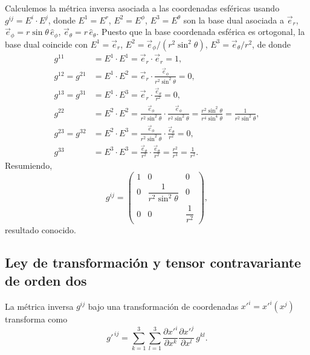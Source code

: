 Calculemos la métrica inversa asociada a las coordenadas esféricas usando $g^{ij}=E^i\cdot E^j$, donde $E^1=E^r$, $E^2=E^\phi$, $E^3=E^\theta$ son la base dual asociada a $\vec e_r$, $\vec e_\phi=r\sin\theta\,\hat e_\phi$, $\vec e_\theta = r\,\hat e_\theta$. Puesto que la base coordenada esférica es ortogonal, la base dual coincide con $E^1=\vec e_r$, $E^2=\vec e_\phi/(r^2\sin^2\theta)$, $E^3=\vec e_\theta/r^2$, de donde
\begin{align}
g^{11} &= E^1\cdot E^1 = \vec e_r\cdot\vec e_r = 1, \\
g^{12}=g^{21} &= E^1\cdot E^2 = \vec e_r\cdot \frac{\vec e_\phi}{r^2\sin^2\theta} = 0, \\
g^{13}=g^{31} &= E^1\cdot E^3 = \vec e_r\cdot\frac{\vec e_\theta}{r^2} = 0, \\
g^{22} &= E^2\cdot E^2 = \frac{\vec e_\phi}{r^2\sin^2\theta}\cdot\frac{\vec e_\phi}{r^2\sin^2\theta}
= \frac{r^2\sin^2\theta}{r^4\sin^4\theta} = \frac{1}{r^2\sin^2\theta}, \\
g^{23}=g^{32} &= E^2\cdot E^3 = \frac{\vec e_\phi}{r^2\sin^2\theta}\cdot\frac{\vec e_\theta}{r^2} = 0, \\
g^{33} &= E^3\cdot E^3 = \frac{\vec e_\theta}{r^2}\cdot\frac{\vec e_\theta}{r^2} = \frac{r^2}{r^4} = \frac{1}{r^2} .
\end{align}
Resumiendo,
\begin{equation}
g^{ij} =
\begin{pmatrix}
1 & 0 & 0 \\
0 & \dfrac{1}{r^2\sin^2\theta} & 0 \\[6pt]
0 & 0 & \dfrac{1}{r^2}
\end{pmatrix},
\end{equation}
resultado conocido.

\subsection{Ley de transformación y tensor contravariante de orden dos}

\begin{proposicion}
La métrica inversa $g^{ij}$ bajo una transformación de coordenadas $x'^i=x'^i(x^j)$ transforma como
\begin{equation}
g'^{\,ij} = \sum_{k=1}^3\sum_{l=1}^3 \frac{\partial x'^i}{\partial x^k}\frac{\partial x'^j}{\partial x^l}\, g^{kl} .
\end{equation}
\end{proposicion}

